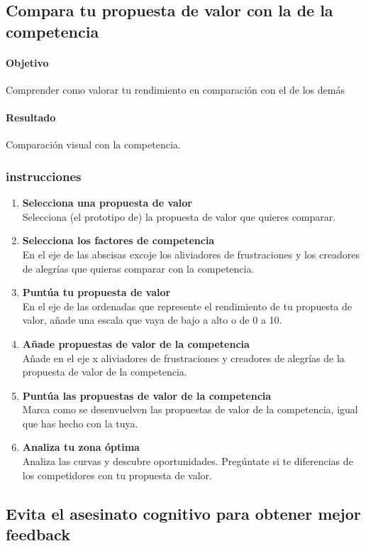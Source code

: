 \documentclass[11pt]{book}
\begin{document}
\subsection{Compara tu propuesta de valor con la de la competencia}
\paragraph{Objetivo}
Comprender como valorar tu rendimiento en comparación con el de los demás
\paragraph{Resultado}
Comparación visual con la competencia.
\subsubsection{instrucciones}
\begin{enumerate}
\item \textbf{ Selecciona una propuesta de valor }\\
Selecciona (el prototipo de) la propuesta de valor que quieres comparar.
\item \textbf{ Selecciona los factores de competencia }\\
En el eje de las abscisas excoje los aliviadores de frustraciones y los creadores de alegrías que quieras comparar con la competencia.
\item \textbf{ Puntúa tu propuesta de valor }\\
En el eje de las ordenadas que represente el rendimiento de tu propuesta de valor, añade una escala que vaya de bajo a alto o de 0 a 10. 
\item \textbf{ Añade propuestas de valor de la competencia }\\
Añade en el eje x aliviadores de frustraciones y creadores de alegrías de la propuesta de valor de la competencia.
\item \textbf{ Puntúa las propuestas de valor de la competencia  }\\
Marca como se desenvuelven las propuestas de valor de la competencia, igual que has hecho con la tuya.
\item \textbf{ Analiza tu zona óptima }\\
Analiza las curvas y descubre oportunidades. Pregúntate si te diferencias de los competidores con tu propuesta de valor.
\end{enumerate}
\subsection{Evita el asesinato cognitivo para obtener mejor feedback}
\end{document}
